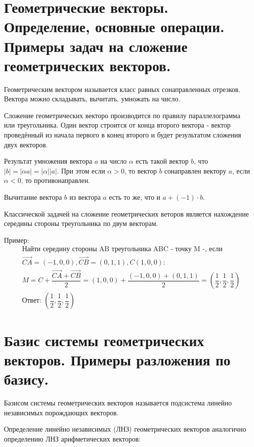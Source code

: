 \documentclass[12pt]{article}
\begin{document}
\begin{sloppypar}
    \section{Геометрические векторы. Определение, основные операции. Примеры задач на сложение геометрических векторов.}
    Геометрическим вектором называется класс равных сонаправленных отрезков. Вектора можно складывать, вычитать, умножать на число.

    Сложение геометрических векторо производится по правилу параллелограмма или треугольника. Один вектор строится от конца второго вектора - вектор проведённый из начала первого в конец второго и будет результатом сложения двух векторов.

    Результат умножения вектора $a$ на число $\alpha$ есть такой вектор $b$, что $|b| = |\alpha a| = |\alpha||a|$. При этом если $\alpha > 0$, то вектор $b$ сонаправлен вектору $a$, если $\alpha < 0$, то противонаправлен.

    Вычитание вектора $b$ из вектора $a$ есть то же, что и $a + (-1)\cdot b$.

    Классической задачей на сложение геометрических веторов является нахождение середины стороны треугольника по двум векторам.

    Пример:
    \begin{align*}
         & \text{Найти середину стороны AB треугольника ABC - точку M -, если}                                                                            \\
         & \Vec{CA} = (-1, 0, 0), \Vec{CB} = (0, 1, 1), C(1, 0, 0):                                                                                       \\
         & M = C + \dfrac{\Vec{CA} + \Vec{CB}}{2} = (1, 0, 0) + \dfrac{(-1, 0, 0) + (0, 1, 1)}{2} = \left(\dfrac{1}{2}, \dfrac{1}{2}, \dfrac{1}{2}\right) \\
         & \text{Ответ: } \left(\dfrac{1}{2}, \dfrac{1}{2}, \dfrac{1}{2}\right)
    \end{align*}

    \section{Базис системы геометрических векторов. Примеры разложения по базису.}
    Базисом системы геометрических векторов называется подсистема линейно независимых порождающих векторов.

    Определение линейно независимых (ЛНЗ) геометрических векторов аналогично определению ЛНЗ арифметических векторов:


\end{sloppypar}
\end{document}
